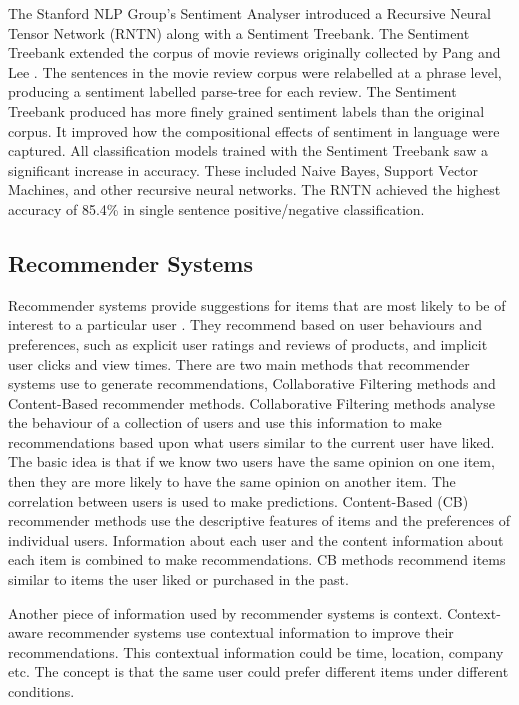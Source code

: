 The Stanford NLP Group's Sentiment Analyser \cite{stanfordSentiment2013} introduced a Recursive Neural Tensor Network (RNTN) along with a Sentiment Treebank. The Sentiment Treebank extended the corpus of movie reviews originally collected by Pang and Lee \cite{panglee2004}. The sentences in the movie review corpus were relabelled at a phrase level, producing a sentiment labelled parse-tree for each review. The Sentiment Treebank produced has more finely grained sentiment labels than the original corpus. It improved how the compositional effects of sentiment in language were captured. All classification models trained with the Sentiment Treebank saw a significant increase in accuracy. These included Naive Bayes, Support Vector Machines, and other recursive neural networks. The RNTN achieved the highest accuracy of 85.4\% in single sentence positive/negative classification.

\subsection{Recommender Systems}

Recommender systems provide suggestions for items that are most likely to be of interest to a particular user \cite{Ricci2015}. They recommend based on user behaviours and preferences, such as explicit user ratings and reviews of products, and implicit user clicks and view times. There are two main methods that recommender systems use to generate recommendations, Collaborative Filtering methods and Content-Based recommender methods. Collaborative Filtering methods analyse the behaviour of a collection of users and use this information to make recommendations based upon what users similar to the current user have liked. The basic idea is that if we know two users have the same opinion on one item, then they are more likely to have the same opinion on another item. The correlation between users is used to make predictions. Content-Based (CB) recommender methods use the descriptive features of items and the preferences of individual users. Information about each user and the content information about each item is combined to make recommendations. CB methods recommend items similar to items the user liked or purchased in the past.

Another piece of information used by recommender systems is context. Context-aware recommender systems use contextual information to improve their recommendations. This contextual information could be time, location, company etc. The concept is that the same user could prefer different items under different conditions.

